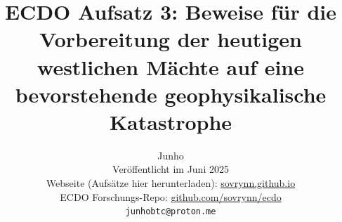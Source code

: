 \documentclass[10pt,twocolumn,letterpaper]{article}
\begin{document}
\title{ECDO Aufsatz 3: Beweise für die Vorbereitung der heutigen westlichen Mächte auf eine bevorstehende geophysikalische Katastrophe}

\author{Junho\\
Veröffentlicht im Juni 2025\\
Webseite (Aufsätze hier herunterladen): \href{https://sovrynn.github.io}{sovrynn.github.io}\\
ECDO Forschungs-Repo: \href{https://github.com/sovrynn/ecdo}{github.com/sovrynn/ecdo}\\
{\tt\small junhobtc@proton.me}
}

\maketitle
\end{document}
